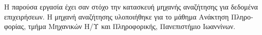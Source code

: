 \textgreek{
    Η παρούσα εργασία έχει σαν στόχο την κατασκευή μηχανής αναζήτησης
    για δεδομένα επιχειρήσεων. Η μηχανή αναζήτησης υλοποιήθηκε για
    το μάθημα Ανάκτηση Πληροφορίας, τμήμα Μηχανικών Η/Υ και Πληροφορικής,
    Πανεπιστήμιο Ιωαννίνων.
}
